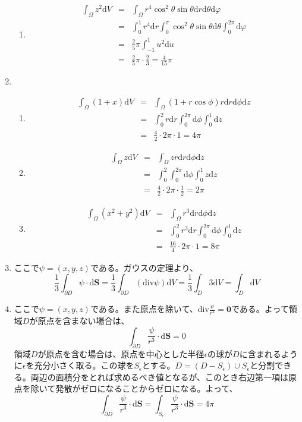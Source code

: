 \documentclass{jarticle}
\def\d{\mathrm d}
\def\div{\mathrm{div}}
\begin{document}
\begin{enumerate}
\begin{enumerate}
        \item
          \begin{eqnarray*}
            \int_\Omega z^2 \d V & = & \int_\Omega r^4 \cos^2 \theta \sin \theta \d r \d \theta \d \varphi \\
            & = & \int_0^1 r^4 \d r \int_0^{\pi} \cos^2 \theta \sin \theta \d \theta \int_0^{2\pi} \d \varphi \\
            & = & \frac{2}{5} \pi \int_{-1}^{1} u^2 \d u \\
            & = & \frac{2}{5} \pi \cdot \frac{2}{3} = \frac{4}{15} \pi
          \end{eqnarray*}
      \end{enumerate}
    \item
      \begin{enumerate}
        \item
          \begin{eqnarray*}
            \int_\Omega (1+x) \d V & = & \int_\Omega (1+r \cos \phi) r \d r \d \phi \d z \\
            & = & \int_0^2 r \d r \int_0^{2\pi} \d \phi \int_0^1 \d z \\
            & = & \frac{4}{2} \cdot 2\pi \cdot 1 = 4 \pi
          \end{eqnarray*}
        \item
          \begin{eqnarray*}
            \int_\Omega z \d V & = & \int_\Omega z r \d r \d \phi \d z \\
            & = & \int_0^2 \int_0^{2\pi} \d \phi \int_0^1 z \d z \\
            & = & \frac{4}{2} \cdot 2\pi \cdot \frac{1}{2} = 2\pi
          \end{eqnarray*}
        \item
          \begin{eqnarray*}
            \int_\Omega (x^2+y^2) \d V & = & \int_\Omega r^3 \d r \d \phi \d z \\
            & = & \int_0^2 r^3 \d r \int_0^{2\pi} \d \phi \int_0^1 \d z \\
            & = & \frac{16}{4} \cdot 2\pi \cdot 1 = 8 \pi
          \end{eqnarray*}
      \end{enumerate}
    \item
      ここで$\psi=(x,y,z)$である。ガウスの定理より、
      \[ \frac{1}{3} \int_{\partial D} \psi \cdot \d \bm{S} = \frac{1}{3} \int_{\partial D} (\div \psi) \d V = \frac{1}{3} \int_D 3 \d V = \int_D \d V \]
    \item
      ここで$\psi=(x,y,z)$である。また原点を除いて、$\div \frac{\psi}{r^3} = \bm 0$である。よって領域$D$が原点を含まない場合は、
      \[ \int_{\partial D} \frac{\psi}{r^3} \cdot \d {\bm S} = 0 \]
      領域$D$が原点を含む場合は、原点を中心とした半径$\epsilon$の球が$D$に含まれるように$\epsilon$を充分小さく取る。この球を$S_\epsilon$とする。$D = (D - S_\epsilon) \cup S_\epsilon$と分割できる。両辺の面積分をとれば求めるべき値となるが、このとき右辺第一項は原点を除いて発散がゼロになることからゼロになる。よって、
      \[ \int_{\partial D} \frac{\psi}{r^3} \cdot \d {\bm S} = \int_{S_\epsilon} \frac{\psi}{r^3} \cdot \d {\bm S} = 4 \pi\]
  \end{enumerate}
\end{document}

